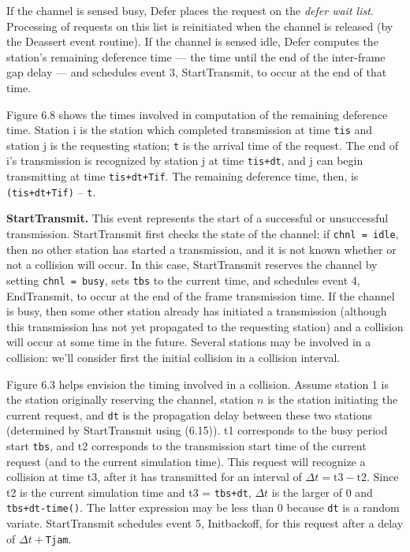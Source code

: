 If the channel is sensed busy, Defer places the request on the \emph{defer wait list}. Processing of requests on this list is reinitiated when the channel is released (by the Deassert event routine). If the channel is sensed idle, Defer computes the station's remaining deference time --- the time until the end of the inter-frame gap delay --- and schedules event 3, StartTransmit, to occur at the end of that time.



Figure 6.8 shows the times involved in computation of the remaining deference time. Station i is the station which completed transmission at time \texttt{tis} and station j is the requesting station; \texttt{t} is the arrival time of the request. The end of i's transmission is recognized by station j at time \texttt{tis+dt}, and j can begin transmitting at time \texttt{tis+dt+Tif}. The remaining deference time, then, is \texttt{(tis+dt+Tif)} -- \texttt{t}.

\noindent\textbf{StartTransmit.} This event represents the start of a successful or unsuccessful transmission. StartTransmit first checks the state of the channel: if \texttt{chnl = idle}, then no other station has started a transmission, and it is not known whether or not a collision will occur. In this case, StartTransmit reserves the channel by setting \texttt{chnl = busy}, sets \texttt{tbs} to the current time, and schedules event 4, EndTransmit, to occur at the end of the frame transmission time. If the channel is busy, then some other station already has initiated a transmission (although this transmission has not yet
\noindent propagated to the requesting station) and a collision will occur at some time in the future. Several stations may be involved in a collision: we'll consider first the initial collision in a collision interval.

Figure 6.3 helps envision the timing involved in a collision. Assume station 1 is the station originally reserving the channel, station $n$ is the station initiating the current request, and \texttt{dt} is the propagation delay between these two stations (determined by StartTransmit using (6.15)). t1 corresponds to the busy period start \texttt{tbs}, and t2 corresponds to the transmission start time of the current request (and to the current simulation time). This request will recognize a collision at time t3, after it has transmitted for an interval of $\Delta t=\text{t3}-\text{t2}$. Since t2 is the current simulation time and t3 = \texttt{tbs+dt}, $\Delta t$ is the larger of 0 and \texttt{tbs+dt-time()}. The latter expression may be less than 0 because \texttt{dt} is a random variate. StartTransmit schedules event 5, Initbackoff, for this request after a delay of $\Delta t+$\texttt{Tjam}.

